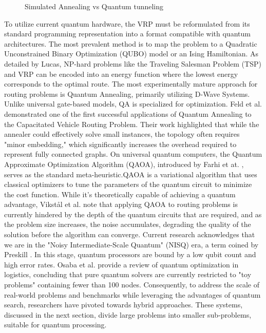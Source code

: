 \documentclass[a4paper]{report}
\begin{document}
{\begin{itemize}
\begin{figure}[ht]
\begin{tikzpicture}[>=Stealth, font=\sffamily]
\end{tikzpicture}
\caption{Simulated Annealing vs Quantum tunneling }
\label{quantum tunneling}
\end{figure}
\newline
\indent To utilize current quantum hardware, the VRP must be reformulated from its standard programming representation into a format compatible with quantum architectures. The most prevalent method is to map the problem to a Quadratic Unconstrained Binary Optimization (QUBO) model or an Ising Hamiltonian. As detailed by Lucas\cite{lucas2014ising}, NP-hard problems like the Traveling Salesman Problem (TSP) and VRP can be encoded into an energy function where the lowest energy corresponds to the optimal route.
\newline
\indent The most experimentally mature approach for routing problems is Quantum Annealing, primarily utilizing D-Wave Systems. Unlike universal gate-based models, QA is specialized for optimization. Feld et al. \cite{feld2019hybrid} demonstrated one of the first successful applications of Quantum Annealing to the Capacitated Vehicle Routing Problem. Their work highlighted that while the annealer could effectively solve small instances, the topology often requires "minor embedding," which significantly increases the overhead required to represent fully connected graphs.
\newline
\indent On universal quantum computers, the Quantum Approximate Optimization Algorithm (QAOA), introduced by Farhi et at. \cite{farhi2014quantum}, serves as the standard meta-heuristic.\newline QAOA is a variational algorithm that uses classical optimizers to tune the parameters of the quantum circuit to minimize the cost function. While it's theoretically capable of achieving a quantum advantage, Vikstål et al. \cite{vikstal2020applying} note that applying QAOA to routing problems is currently hindered by the depth of the quantum circuits that are required, and as the problem size increases, the noise accumulates, degrading the quality of the solution before the algorithm can converge.
\newline
\indent Current research acknowledges that we are in the "Noisy Intermediate-Scale Quantum" (NISQ) era, a term coined by Preskill \cite{preskill2018quantum}. In this stage, quantum processors are bound by a low qubit count and high error rates. Osaba et al. \cite{osaba2021hybrid} provide a review of quantum optimization in logistics, concluding that pure quantum solvers are currently restricted to "toy problems" containing fewer than 100 nodes.
\newline
\indent Consequently, to address the scale of real-world problems and benchmarks while leveraging the advantages of quantum search, researchers have pivoted towards hybrid approaches. These systems, discussed in the next section, divide large problems into smaller sub-problems, suitable for quantum processing.

\end{itemize}}
\end{document}
